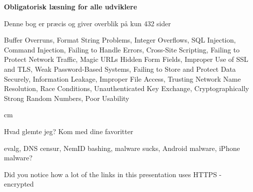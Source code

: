 \documentclass[20pt,landscape,a4paper,footrule]{foils}
\begin{document}
\begin{list1}
\item {\bf Obligatorisk læsning for alle udviklere}
\item Denne bog er præcis og giver overblik på kun 432 sider
\item Buffer Overruns, Format String Problems, Integer Overflows, SQL Injection, Command Injection,
Failing to Handle Errors, Cross-Site Scripting, Failing to Protect Network Traffic, Magic URLs Hidden Form Fields,
Improper Use of SSL and TLS, Weak Password-Based Systems, Failing to Store and Protect Data Securely, Information
Leakage, Improper File Access, Trusting Network Name Resolution, Race Conditions, Unauthenticated Key Exchange, Cryptographically Strong Random Numbers, Poor Usability
\end{list1}



 cm

\centerline{\Large Hvad glemte jeg? Kom med dine favoritter \smiley}

evalg, DNS censur, NemID bashing, malware sucks, Android malware, iPhone malware?

Did you notice how a lot of the links in this presentation uses HTTPS - encrypted


\myquestionspage
\end{document}
